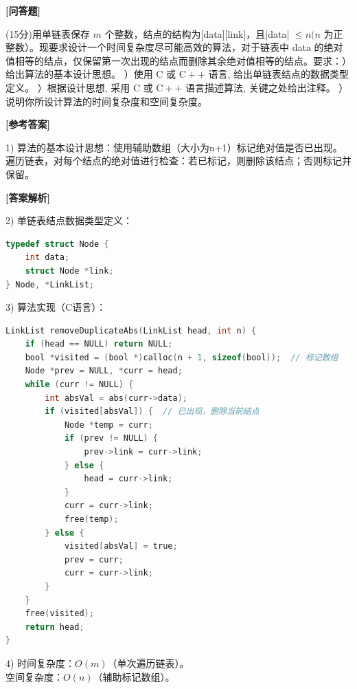 \documentclass[12pt,a4paper]{article}
\newenvironment{choicequestion}[1][]{%
    \vspace{0.5cm}
    \noindent\textbf{[#1]}
    \vspace{0.2cm}
}{}
\newenvironment{answersection}{%
    \vspace{0.2cm}
    \noindent\textbf{[参考答案]}\\
    \vspace{0.1cm}
}{}
\newenvironment{analysissection}{%
    \vspace{0.2cm}
    \noindent\textbf{[答案解析]}\\
    \vspace{0.1cm}
}{}
\newcounter{questioncounter}
\newcounter{questioncounter}
\newcommand{\question}[2]{%
    \stepcounter{questioncounter}%
    \noindent\textbf{\thequestioncounter} #1%
}
\begin{document}
\begin{choicequestion}[问答题]
\question{(15分)用单链表保存 $m$ 个整数，结点的结构为[data][link]，且|data| $\leqslant n(n$ 为正整数）。现要求设计一个时间复杂度尽可能高效的算法，对于链表中 data 的绝对值相等的结点，仅保留第一次出现的结点而删除其余绝对值相等的结点。要求：\newline
1）给出算法的基本设计思想。  \newline
2）使用 C 或 $\mathrm{C}++$ 语言, 给出单链表结点的数据类型定义。  \newline
3）根据设计思想, 采用 C 或 $\mathrm{C}++$ 语言描述算法, 关键之处给出注释。  \newline
4）说明你所设计算法的时间复杂度和空间复杂度。}{}

\begin{answersection}
1) 算法的基本设计思想：使用辅助数组（大小为n+1）标记绝对值是否已出现。遍历链表，对每个结点的绝对值进行检查：若已标记，则删除该结点；否则标记并保留。
\end{answersection}

\begin{analysissection}
2) 单链表结点数据类型定义：
\begin{lstlisting}[language=C]
typedef struct Node {
    int data;
    struct Node *link;
} Node, *LinkList;
\end{lstlisting}

3) 算法实现（C语言）：
\begin{lstlisting}[language=C]
LinkList removeDuplicateAbs(LinkList head, int n) {
    if (head == NULL) return NULL;
    bool *visited = (bool *)calloc(n + 1, sizeof(bool));  // 标记数组
    Node *prev = NULL, *curr = head;
    while (curr != NULL) {
        int absVal = abs(curr->data);
        if (visited[absVal]) {  // 已出现，删除当前结点
            Node *temp = curr;
            if (prev != NULL) {
                prev->link = curr->link;
            } else {
                head = curr->link;
            }
            curr = curr->link;
            free(temp);
        } else {
            visited[absVal] = true;
            prev = curr;
            curr = curr->link;
        }
    }
    free(visited);
    return head;
}
\end{lstlisting}

4) 时间复杂度：$O(m)$（单次遍历链表）。\\
空间复杂度：$O(n)$（辅助标记数组）。
\end{analysissection}
\end{choicequestion}
\end{document}
